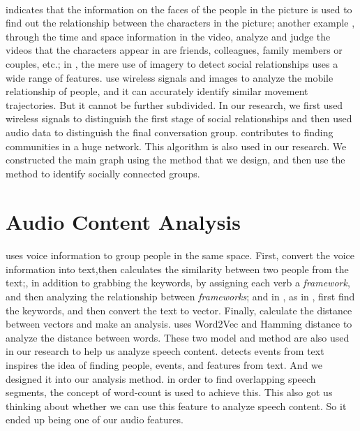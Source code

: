 \documentclass[a4paper,12pt]{report}
\begin{document}
\paragraph{}
\cite{guo2019social} indicates that the information on the faces of the people in the picture is used to find out the relationship between the characters in the picture; another example \cite{liu2019social}, through the time and space information in the video, analyze and judge the videos that the characters appear in are friends, colleagues, family members or couples, etc.; in \cite{akbari2021deep}, the mere use of imagery to detect social relationships uses a wide range of features. \cite{lai2021viwise} use wireless signals and images to analyze the mobile relationship of people, and it can accurately identify similar movement trajectories. But it cannot be further subdivided. In our research, we first used wireless signals to distinguish the first stage of social relationships and then used audio data to distinguish the final conversation group. \cite{blondel2008fast} contributes to finding communities in a huge network. This algorithm is also used in our research. We constructed the main graph using the method that we design, and then use the method \cite{blondel2008fast} to identify socially connected groups.
\section{Audio Content Analysis}
\paragraph{}
\cite{tao2019audio} uses voice information to group people in the same space. First, convert the voice information into text,then calculates the similarity between two people from the text;\cite{li2019scoring}, in addition to grabbing the keywords, by assigning each verb a \emph{framework}, and then analyzing the relationship between \emph{frameworks}; and in \cite{chen2020topic}, as in \cite{li2019scoring}, first find the keywords, and then convert the text to vector. Finally, calculate the distance between vectors and make an analysis. \cite{8342858} uses Word2Vec and Hamming distance to analyze the distance between words. These two model and method are also used in our research to help us analyze speech content. \cite{liu2018event} detects events from text inspires the idea of finding people, events, and features from text. And we designed it into our analysis method. \cite{7178867} in order to find overlapping speech segments, the concept of word-count is used to achieve this. This also got us thinking about whether we can use this feature to analyze speech content. So it ended up being one of our audio features.
\end{document}
